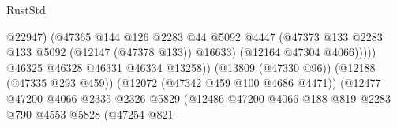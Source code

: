 \begin{lexlean}{RustStd}
\begin{coremodule}
                                                            @22947)
                                                          (@47365
                                                            @144
                                                            @126
                                                            @2283
                                                            @44
                                                            @5092
                                                            @4447
                                                            (@47373
                                                              @133
                                                              @2283
                                                              @133
                                                              @5092
                                                              (@12147 (@47378 @133))
                                                              @16633)
                                                            (@12164 @47304 @4066)))))
                                                    @46325
                                                    @46328
                                                    @46331
                                                    @46334
                                                    @13258))
                                                (@13809 (@47330 @96))
                                                (@12188 (@47335 @293 @459))
                                                (@12072 (@47342 @459 @100 @4686 @4471))
                                                (@12477
                                                  @47200
                                                  @4066
                                                  @2335
                                                  @2326
                                                  @5829
                                                  (@12486
                                                    @47200
                                                    @4066
                                                    @188
                                                    @819
                                                    @2283
                                                    @790
                                                    @4553
                                                    @5828
                                                    (@47254
                                                      @821

\end{coremodule}
\end{lexlean}
